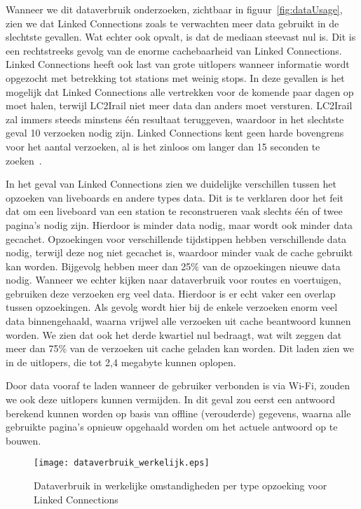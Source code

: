 Wanneer we dit dataverbruik onderzoeken, zichtbaar in figuur~\ref{fig:dataUsage}, zien we dat Linked Connections zoals te verwachten meer data gebruikt in de slechtste gevallen. Wat echter ook opvalt, is dat de mediaan steevast nul is. Dit is een rechtstreeks gevolg van de enorme cachebaarheid van Linked Connections. Linked Connections heeft ook last van grote uitlopers wanneer informatie wordt opgezocht met betrekking tot stations met weinig stops. In deze gevallen is het mogelijk dat Linked Connections alle vertrekken voor de komende paar dagen op moet halen, terwijl LC2Irail niet meer data dan anders moet versturen. LC2Irail zal immers steeds minstens één resultaat teruggeven, waardoor in het slechtste geval 10 verzoeken nodig zijn. Linked Connections kent geen harde bovengrens voor het aantal verzoeken, al is het zinloos om langer dan 15 seconden te zoeken~\citep{miller68}.

In het geval van Linked Connections zien we duidelijke verschillen tussen het opzoeken van liveboards en andere types data. Dit is te verklaren door het feit dat om een liveboard van een station te reconstrueren vaak slechts één of twee pagina's nodig zijn. Hierdoor is minder data nodig, maar wordt ook minder data gecachet. Opzoekingen voor verschillende tijdstippen hebben verschillende data nodig, terwijl deze nog niet gecachet is, waardoor minder vaak de cache gebruikt kan worden. Bijgevolg hebben meer dan 25\% van de opzoekingen nieuwe data nodig.
Wanneer we echter kijken naar dataverbruik voor routes en voertuigen, gebruiken deze verzoeken erg veel data. Hierdoor is er echt vaker een overlap tussen opzoekingen. Als gevolg wordt hier bij de enkele verzoeken enorm veel data binnengehaald, waarna vrijwel alle verzoeken uit cache beantwoord kunnen worden. We zien dat ook het derde kwartiel nul bedraagt, wat wilt zeggen dat meer dan 75\% van de verzoeken uit cache geladen kan worden. Dit laden zien we in de uitlopers, die tot 2,4 megabyte kunnen oplopen.

Door data vooraf te laden wanneer de gebruiker verbonden is via Wi-Fi, zouden we ook deze uitlopers kunnen vermijden. In dit geval zou eerst een antwoord berekend kunnen worden op basis van offline (verouderde) gegevens, waarna alle gebruikte pagina's opnieuw opgehaald worden om het actuele antwoord op te bouwen.


\begin{figure}[ht]
	\centering
	\texttt{[image: dataverbruik\_werkelijk.eps]}
	\caption[Werkelijk dataverbruik per opzoeking Linked Connections]{Dataverbruik in werkelijke omstandigheden per type opzoeking voor Linked Connections}
	\label{fig:dataUsageRealLife}
\end{figure}

